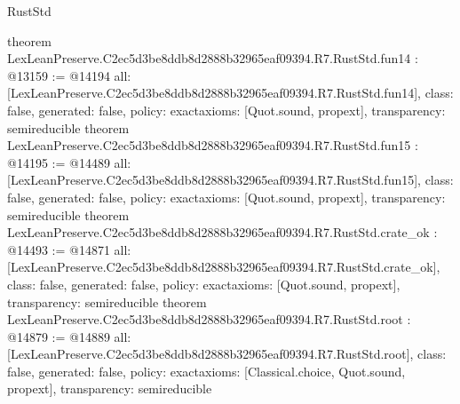 \begin{lexlean}{RustStd}
\begin{coremodule}
{}
theorem LexLeanPreserve.C2ec5d3be8ddb8d2888b32965eaf09394.R7.RustStd.fun14 : @13159 := @14194 {
  all: [LexLeanPreserve.C2ec5d3be8ddb8d2888b32965eaf09394.R7.RustStd.fun14],
  class: false,
  generated: false,
  policy: exact{axioms: [Quot.sound, propext]},
  transparency: semireducible
}
theorem LexLeanPreserve.C2ec5d3be8ddb8d2888b32965eaf09394.R7.RustStd.fun15 : @14195 := @14489 {
  all: [LexLeanPreserve.C2ec5d3be8ddb8d2888b32965eaf09394.R7.RustStd.fun15],
  class: false,
  generated: false,
  policy: exact{axioms: [Quot.sound, propext]},
  transparency: semireducible
}
theorem LexLeanPreserve.C2ec5d3be8ddb8d2888b32965eaf09394.R7.RustStd.crate_ok : @14493 := @14871 {
  all: [LexLeanPreserve.C2ec5d3be8ddb8d2888b32965eaf09394.R7.RustStd.crate_ok],
  class: false,
  generated: false,
  policy: exact{axioms: [Quot.sound, propext]},
  transparency: semireducible
}
theorem LexLeanPreserve.C2ec5d3be8ddb8d2888b32965eaf09394.R7.RustStd.root : @14879 := @14889 {
  all: [LexLeanPreserve.C2ec5d3be8ddb8d2888b32965eaf09394.R7.RustStd.root],
  class: false,
  generated: false,
  policy: exact{axioms: [Classical.choice, Quot.sound, propext]},
  transparency: semireducible
}


\end{coremodule}
\end{lexlean}
